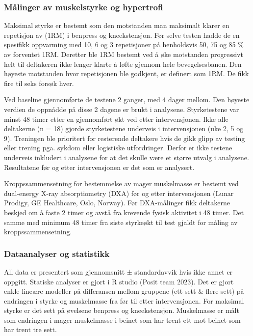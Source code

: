 \documentclass[
  letterpaper,
  DIV=11,
  numbers=noendperiod]{scrartcl}
\begin{document}
\hypertarget{muxe5linger-av-muskelstyrke-og-hypertrofi}{%
\subsubsection{Målinger av muskelstyrke og
hypertrofi}\label{muxe5linger-av-muskelstyrke-og-hypertrofi}}

Maksimal styrke er bestemt som den motstanden man maksimalt klarer en
repetisjon av (1RM) i benpress og kneekstensjon. Før selve testen hadde
de en spesifikk oppvarming med 10, 6 og 3 repetisjoner på henholdsvis
50, 75 og 85 \% av forventet 1RM. Deretter ble 1RM bestemt ved å øke
motstanden progressivt helt til deltakeren ikke lenger klarte å løfte
gjennom hele bevegelsesbanen. Den høyeste motstanden hvor repetisjonen
ble godkjent, er definert som 1RM. De fikk fire til seks forsøk hver.

Ved baseline gjennomførte de testene 2 ganger, med 4 dager mellom. Den
høyeste verdien de oppnådde på disse 2 dagene er brukt i analysene.
Styrketestene var minst 48 timer etter en gjennomført økt ved etter
intervensjonen. Ikke alle deltakerne (n = 18) gjorde styrketestene
underveis i intervensjonen (uke 2, 5 og 9). Treningen ble prioritert for
resterende deltakere hvis de gikk glipp av testing eller trening pga.
sykdom eller logistiske utfordringer. Derfor er ikke testene underveis
inkludert i analysene for at det skulle være et større utvalg i
analysene. Resultatene før og etter intervensjonen er det som er
analysert.

Kroppssammensetning for bestemmelse av mager muskelmasse er bestemt ved
dual-energy X-ray absorptiometry (DXA) før og etter intervensjonen
(Lunar Prodigy, GE Healthcare, Oslo, Norway). Før DXA-målinger fikk
deltakerne beskjed om å faste 2 timer og avstå fra krevende fysisk
aktivitet i 48 timer. Det samme med minimum 48 timer fra siste styrkeøkt
til test gjaldt for måling av kroppssammensetning.

\hypertarget{dataanalyser-og-statistikk}{%
\subsubsection{Dataanalyser og
statistikk}\label{dataanalyser-og-statistikk}}

All data er presentert som gjennomsnitt ± standardavvik hvis ikke annet
er oppgitt. Statiske analyser er gjort i R studio (Posit team 2023). Det
er gjort enkle lineære modeller på differansen mellom gruppene (ett sett
\& flere sett) på endringen i styrke og muskelmasse fra før til etter
intervensjonen. For maksimal styrke er det sett på øvelsene benpress og
kneekstensjon. Muskelmasse er målt som endringen i mager muskelmasse i
beinet som har trent ett mot beinet som har trent tre sett.
\end{document}
